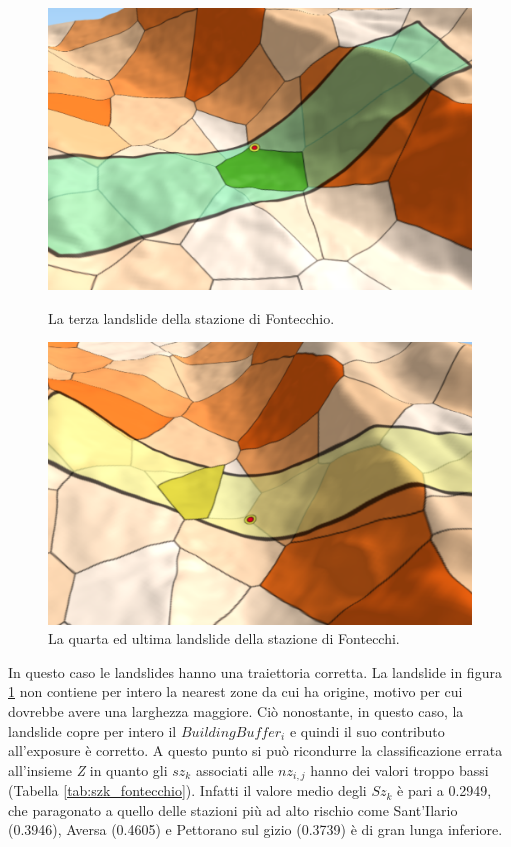 \begin{figure}[h]
	\hspace{0.1\linewidth}
	\begin{minipage}[t]{0.35\linewidth}
		\centering
		\includegraphics[width=1\textwidth]{images/FontecchioLandslide3}
		\caption{La terza landslide della stazione di Fontecchio.}
		\label{fontecchiolandslide3}
	\end{minipage}
	\hspace{0.1\linewidth}
	\begin{minipage}[t]{0.35\linewidth}
		\centering
		\includegraphics[width=1\textwidth]{images/FontecchioLandslide4}
		\caption{La quarta ed ultima landslide della stazione di Fontecchi.}
		\label{fontecchiolandslide4}
	\end{minipage}
\end{figure}

In questo caso le landslides hanno una traiettoria corretta. La landslide in figura \ref{fontecchiolandslide4} non contiene per intero la nearest zone da cui ha origine, motivo per cui dovrebbe avere una larghezza maggiore. Ciò nonostante, in questo caso, la landslide copre per intero il $BuildingBuffer_i$ e quindi il suo contributo all'exposure è corretto. A questo punto si può ricondurre la  classificazione errata all'insieme \textit{Z} in quanto gli $sz_k$ associati alle $nz_{i,j}$ hanno dei valori troppo bassi (Tabella \ref{tab:szk_fontecchio}). Infatti il valore medio degli $Sz_k$ è pari a 0.2949, che paragonato a quello delle  stazioni più ad alto rischio come  Sant'Ilario (0.3946), Aversa (0.4605) e Pettorano sul gizio (0.3739) è di gran lunga inferiore.

